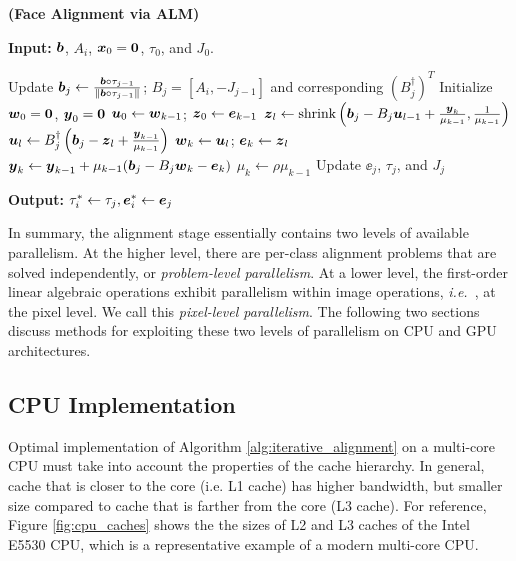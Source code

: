 \documentclass[preprint]{sigplanconf}
\def\ie{\emph{i.e.\ }}
\begin{document}
\begin{algorithm}[ht!]
\caption{\bf (Face Alignment via ALM)} \label{alg:iterative_alignment}
\small
{\bf Input:} ${\boldsymbol{b}}$, $A_i$, ${\boldsymbol{x}}_0 = \boldsymbol{0}$, $\tau_0$, and $J_0$.
\begin{algorithmic}[1]
\STATE Update ${\boldsymbol{b}}_j \leftarrow \frac{{\boldsymbol{b}}\circ \tau_{j-1}}{\|{\boldsymbol{b}}\circ \tau_{j-1}\|}$; $B_j= [A_i, -J_{j-1}]$ and corresponding $(B_j^\dagger)^T$
\STATE Initialize ${\boldsymbol{w}}_0 = \boldsymbol 0$, ${\boldsymbol{y}}_0 = \boldsymbol 0$
\STATE ${\boldsymbol{u}}_0\leftarrow {\boldsymbol{w}}_{k-1}$; ${\boldsymbol{z}}_0\leftarrow {\boldsymbol{e}}_{k-1}$
\STATE ${\boldsymbol{z}}_l \leftarrow {\text{shrink}}\left({\boldsymbol{b}}_j - B_j{\boldsymbol{u}}_{l-1} + \frac{{\boldsymbol{y}}_{k}}{\mu_{k-1}}, \frac{1}{\mu_{k-1}}\right)$
\STATE ${\boldsymbol{u}}_l \leftarrow B_j^\dagger \left({\boldsymbol{b}}_j - {\boldsymbol{z}}_{l} + \frac{{\boldsymbol{y}}_{k-1}}{\mu_{k-1}} \right) $
\ENDWHILE
\STATE ${\boldsymbol{w}}_k \leftarrow {\boldsymbol{u}}_l$; ${\boldsymbol{e}}_k \leftarrow {\boldsymbol{z}}_l$
\STATE ${\boldsymbol{y}}_{k} \leftarrow {\boldsymbol{y}}_{k-1} + \mu_{k-1} ({\boldsymbol{b}}_j - B_j{\boldsymbol{w}}_{k} - \boldsymbol{e}_{k})$
\STATE $\mu_{k} \leftarrow \rho\mu_{k-1}$
\ENDWHILE
\STATE Update $\ee_j$, $\tau_j$, and $J_j$
\ENDWHILE
\end{algorithmic}
{\bf Output:} $\tau_i^*\leftarrow \tau_j, \boldsymbol{e}_i^*\leftarrow {\boldsymbol{e}}_j$
\end{algorithm}

In summary, the alignment stage essentially contains two levels of available
parallelism. At the higher level, there are per-class alignment problems
that are solved independently, or \emph{problem-level parallelism}.  At a lower
level, the first-order linear algebraic operations exhibit parallelism within
image operations, \ie, at the pixel level.  We call this \emph{pixel-level
parallelism}.  The following two sections discuss methods for exploiting
these two levels of parallelism on CPU and GPU architectures.

\subsection{CPU Implementation} \vspace{-0.06in}
\label{sec:alignment_implementation_cpu}

Optimal implementation of Algorithm \ref{alg:iterative_alignment} on a multi-core CPU must take 
into account the properties of the cache hierarchy. In general, cache that is 
closer to the core (i.e. L1 cache) has higher bandwidth, but smaller size compared to cache
that is farther from the core (L3 cache).  For reference, Figure \ref{fig:cpu_caches} 
shows the the sizes of L2 and L3 caches of the Intel E5530 CPU, 
which is a representative example of a modern multi-core CPU. 
\end{document}
